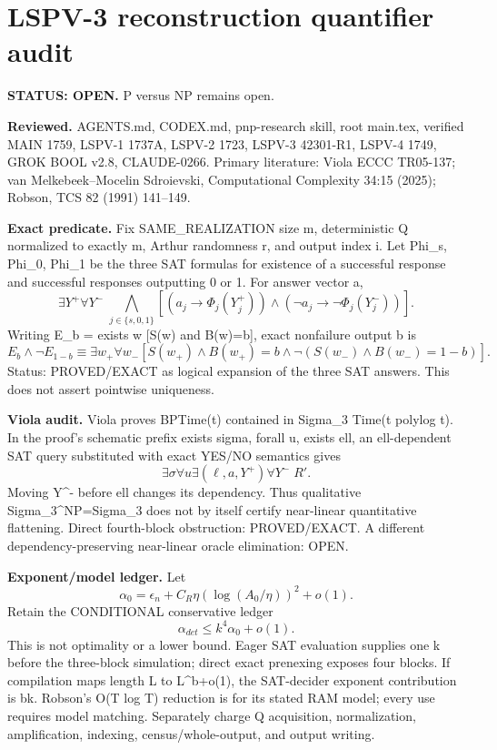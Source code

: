 \documentclass{article}
\begin{document}
\section*{LSPV-3 reconstruction quantifier audit}
\textbf{STATUS: OPEN.} P versus NP remains open.

\textbf{Reviewed.} AGENTS.md, CODEX.md, pnp-research skill, root main.tex, verified MAIN 1759, LSPV-1 1737A, LSPV-2 1723, LSPV-3 42301-R1, LSPV-4 1749, GROK BOOL v2.8, CLAUDE-0266. Primary literature: Viola ECCC TR05-137; van Melkebeek--Mocelin Sdroievski, Computational Complexity 34:15 (2025); Robson, TCS 82 (1991) 141--149.

\textbf{Exact predicate.} Fix SAME_REALIZATION size m, deterministic Q normalized to exactly m, Arthur randomness r, and output index i. Let Phi_s, Phi_0, Phi_1 be the three SAT formulas for existence of a successful response and successful responses outputting 0 or 1. For answer vector a,
\[
\exists Y^+\forall Y^-\;\bigwedge_{j\in\{s,0,1\}}
[(a_j\to\Phi_j(Y_j^+))\wedge(\neg a_j\to\neg\Phi_j(Y_j^-))].
\]
Writing E_b = exists w [S(w) and B(w)=b], exact nonfailure output b is
\[
E_b\wedge\neg E_{1-b}
\equiv
\exists w_+\forall w_-[
S(w_+)\wedge B(w_+)=b\wedge
\neg(S(w_-)\wedge B(w_-)=1-b)].
\]
Status: PROVED/EXACT as logical expansion of the three SAT answers. This does not assert pointwise uniqueness.

\textbf{Viola audit.} Viola proves BPTime(t) contained in Sigma_3 Time(t polylog t). In the proof's schematic prefix exists sigma, forall u, exists ell, an ell-dependent SAT query substituted with exact YES/NO semantics gives
\[
\exists\sigma\forall u\exists(\ell,a,Y^+)\forall Y^-\;R'.
\]
Moving Y^- before ell changes its dependency. Thus qualitative Sigma_3^NP=Sigma_3 does not by itself certify near-linear quantitative flattening. Direct fourth-block obstruction: PROVED/EXACT. A different dependency-preserving near-linear oracle elimination: OPEN.

\textbf{Exponent/model ledger.} Let
\[
\alpha_0=\epsilon_n+C_R\eta(\log(A_0/\eta))^2+o(1).
\]
Retain the CONDITIONAL conservative ledger
\[
\alpha_{det}\le k^4\alpha_0+o(1).
\]
This is not optimality or a lower bound. Eager SAT evaluation supplies one k before the three-block simulation; direct exact prenexing exposes four blocks. If compilation maps length L to L^{b+o(1)}, the SAT-decider exponent contribution is bk. Robson's O(T log T) reduction is for its stated RAM model; every use requires model matching. Separately charge Q acquisition, normalization, amplification, indexing, census/whole-output, and output writing.
\end{document}
